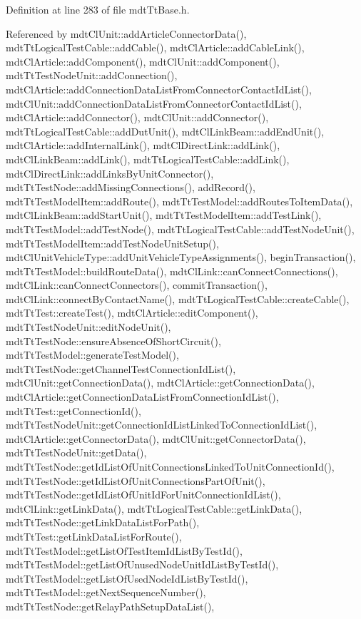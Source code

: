 Definition at line 283 of file mdt\-Tt\-Base.\-h.



Referenced by mdt\-Cl\-Unit\-::add\-Article\-Connector\-Data(), mdt\-Tt\-Logical\-Test\-Cable\-::add\-Cable(), mdt\-Cl\-Article\-::add\-Cable\-Link(), mdt\-Cl\-Article\-::add\-Component(), mdt\-Cl\-Unit\-::add\-Component(), mdt\-Tt\-Test\-Node\-Unit\-::add\-Connection(), mdt\-Cl\-Article\-::add\-Connection\-Data\-List\-From\-Connector\-Contact\-Id\-List(), mdt\-Cl\-Unit\-::add\-Connection\-Data\-List\-From\-Connector\-Contact\-Id\-List(), mdt\-Cl\-Article\-::add\-Connector(), mdt\-Cl\-Unit\-::add\-Connector(), mdt\-Tt\-Logical\-Test\-Cable\-::add\-Dut\-Unit(), mdt\-Cl\-Link\-Beam\-::add\-End\-Unit(), mdt\-Cl\-Article\-::add\-Internal\-Link(), mdt\-Cl\-Direct\-Link\-::add\-Link(), mdt\-Cl\-Link\-Beam\-::add\-Link(), mdt\-Tt\-Logical\-Test\-Cable\-::add\-Link(), mdt\-Cl\-Direct\-Link\-::add\-Links\-By\-Unit\-Connector(), mdt\-Tt\-Test\-Node\-::add\-Missing\-Connections(), add\-Record(), mdt\-Tt\-Test\-Model\-Item\-::add\-Route(), mdt\-Tt\-Test\-Model\-::add\-Routes\-To\-Item\-Data(), mdt\-Cl\-Link\-Beam\-::add\-Start\-Unit(), mdt\-Tt\-Test\-Model\-Item\-::add\-Test\-Link(), mdt\-Tt\-Test\-Model\-::add\-Test\-Node(), mdt\-Tt\-Logical\-Test\-Cable\-::add\-Test\-Node\-Unit(), mdt\-Tt\-Test\-Model\-Item\-::add\-Test\-Node\-Unit\-Setup(), mdt\-Cl\-Unit\-Vehicle\-Type\-::add\-Unit\-Vehicle\-Type\-Assignments(), begin\-Transaction(), mdt\-Tt\-Test\-Model\-::build\-Route\-Data(), mdt\-Cl\-Link\-::can\-Connect\-Connections(), mdt\-Cl\-Link\-::can\-Connect\-Connectors(), commit\-Transaction(), mdt\-Cl\-Link\-::connect\-By\-Contact\-Name(), mdt\-Tt\-Logical\-Test\-Cable\-::create\-Cable(), mdt\-Tt\-Test\-::create\-Test(), mdt\-Cl\-Article\-::edit\-Component(), mdt\-Tt\-Test\-Node\-Unit\-::edit\-Node\-Unit(), mdt\-Tt\-Test\-Node\-::ensure\-Absence\-Of\-Short\-Circuit(), mdt\-Tt\-Test\-Model\-::generate\-Test\-Model(), mdt\-Tt\-Test\-Node\-::get\-Channel\-Test\-Connection\-Id\-List(), mdt\-Cl\-Unit\-::get\-Connection\-Data(), mdt\-Cl\-Article\-::get\-Connection\-Data(), mdt\-Cl\-Article\-::get\-Connection\-Data\-List\-From\-Connection\-Id\-List(), mdt\-Tt\-Test\-::get\-Connection\-Id(), mdt\-Tt\-Test\-Node\-Unit\-::get\-Connection\-Id\-List\-Linked\-To\-Connection\-Id\-List(), mdt\-Cl\-Article\-::get\-Connector\-Data(), mdt\-Cl\-Unit\-::get\-Connector\-Data(), mdt\-Tt\-Test\-Node\-Unit\-::get\-Data(), mdt\-Tt\-Test\-Node\-::get\-Id\-List\-Of\-Unit\-Connections\-Linked\-To\-Unit\-Connection\-Id(), mdt\-Tt\-Test\-Node\-::get\-Id\-List\-Of\-Unit\-Connections\-Part\-Of\-Unit(), mdt\-Tt\-Test\-Node\-::get\-Id\-List\-Of\-Unit\-Id\-For\-Unit\-Connection\-Id\-List(), mdt\-Cl\-Link\-::get\-Link\-Data(), mdt\-Tt\-Logical\-Test\-Cable\-::get\-Link\-Data(), mdt\-Tt\-Test\-Node\-::get\-Link\-Data\-List\-For\-Path(), mdt\-Tt\-Test\-::get\-Link\-Data\-List\-For\-Route(), mdt\-Tt\-Test\-Model\-::get\-List\-Of\-Test\-Item\-Id\-List\-By\-Test\-Id(), mdt\-Tt\-Test\-Model\-::get\-List\-Of\-Unused\-Node\-Unit\-Id\-List\-By\-Test\-Id(), mdt\-Tt\-Test\-Model\-::get\-List\-Of\-Used\-Node\-Id\-List\-By\-Test\-Id(), mdt\-Tt\-Test\-Model\-::get\-Next\-Sequence\-Number(), mdt\-Tt\-Test\-Node\-::get\-Relay\-Path\-Setup\-Data\-List(), 
